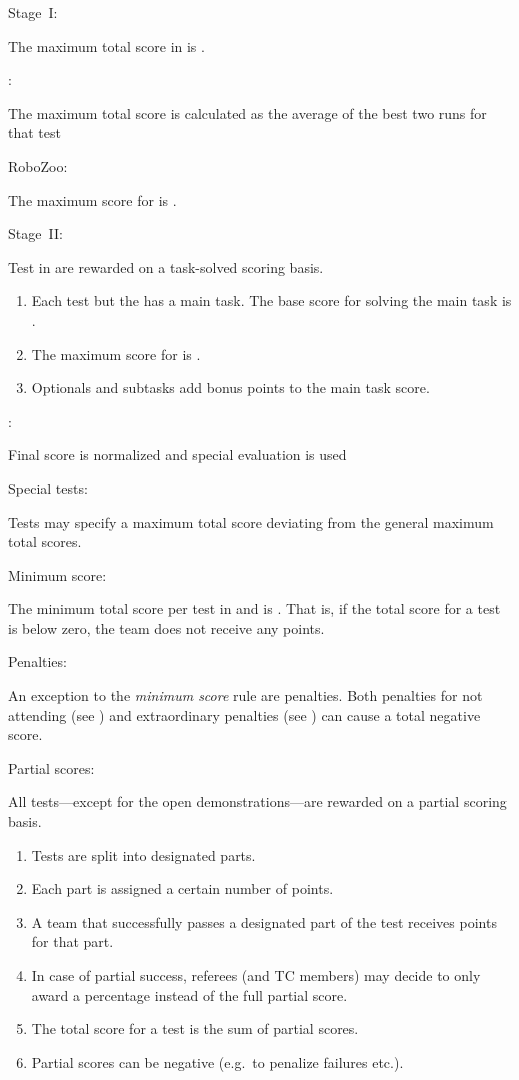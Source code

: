 \begin{enumerate}
  {\bf\item Stage~I:} The maximum total score in  is .
  \begin{enumerate}
    {\bf\item {}:} The maximum total score is calculated as the average of the best two runs for that test
    {\bf\item RoboZoo:} The maximum score for  is .
  \end{enumerate}
  
  {\bf\item Stage~II:} Test in  are rewarded on a task-solved scoring basis.
  \begin{enumerate}
  \item Each test but the  has a main task. The base score for solving the main task is .
  \item The maximum score for  is .
  \item Optionals and subtasks add bonus points to the main task score.
  \end{enumerate}

  {\bf\item {}:} Final score is normalized and special evaluation is used

  {\bf\item Special tests:} Tests may specify a maximum total score deviating from the general maximum total scores.
  {\bf\item Minimum score:} The minimum total score per test in  and  is . That is, if the total score for a test is below zero, the team does not receive any points.
  {\bf\item Penalties:} An exception to the \emph{minimum score} rule are penalties. Both penalties for not attending (see ) and extraordinary penalties (see ) can cause a total negative score. 
  {\bf\item Partial scores:} All tests---except for the open demonstrations---are rewarded on a partial scoring basis. 
  \begin{enumerate}
  \item Tests are split into designated parts.
  \item Each part is assigned a certain number of points.
  \item A team that successfully passes a designated part of the test receives points for that part.
  \item In case of partial success, referees (and TC members) may decide to only award a percentage instead of the full partial score.  
  \item The total score for a test is the sum of partial scores.
  \item Partial scores can be negative (e.g.~to penalize failures etc.).
  \end{enumerate}
\end{enumerate}


